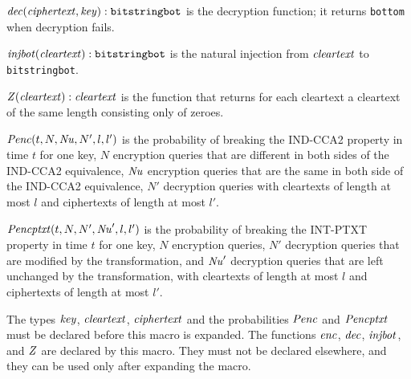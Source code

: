 \documentclass{article}
\begin{document}
\begin{itemize}
   $\mathit{dec}(\mathit{ciphertext}, \mathit{key}): \texttt{bitstringbot}$ is the
  decryption function; it returns \texttt{bottom} when decryption
  fails.

   $\mathit{injbot}(\mathit{cleartext}): \texttt{bitstringbot}$ is the natural
  injection from $\mathit{cleartext}$ to \texttt{bitstringbot}.

   $\mathit{Z}(\mathit{cleartext}): \mathit{cleartext}$ is the function that
  returns for each cleartext a cleartext of the same length consisting
  only of zeroes.

  $\mathit{Penc}(t, N, \mathit{Nu}, N', l, l')$ is the probability of breaking the
  IND-CCA2 property in time $t$ for one key, $N$ encryption queries that are 
  different in both sides of the IND-CCA2 equivalence, 
  $\mathit{Nu}$ encryption queries that are the same in both side of the IND-CCA2 equivalence, $N'$
  decryption queries with cleartexts of length at most $l$ and
  ciphertexts of length at most $l'$.

  $\mathit{Pencptxt}(t, N, N', \mathit{Nu}', l, l')$ is the probability of breaking the
  INT-PTXT property in time $t$ for one key, $N$ encryption queries, $N'$
  decryption queries that are modified by the transformation, and 
  $\mathit{Nu}'$ decryption queries that are left unchanged by the transformation,
  with cleartexts of length at most $l$ and
  ciphertexts of length at most $l'$.

   The types $\mathit{key}$, $\mathit{cleartext}$,
   $\mathit{ciphertext}$ and the probabilities $\mathit{Penc}$ and $\mathit{Pencptxt}$ must
   be declared before this macro is expanded. The functions
   $\mathit{enc}$, $\mathit{dec}$, $\mathit{injbot}$, and $\mathit{Z}$ are declared by this
   macro. They must not be declared elsewhere, and they can be used
   only after expanding the macro.


\end{itemize}
\end{document}

